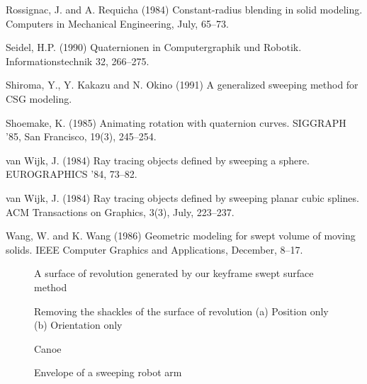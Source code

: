 \begin{thebibliography}{Shoemake 85}
Rossignac, J. and A. Requicha (1984)
Constant-radius blending in solid modeling.
Computers in Mechanical Engineering, July, 65--73.

Seidel, H.P. (1990) Quaternionen in Computergraphik und Robotik.
Informationstechnik 32, 266--275.

Shiroma, Y., Y. Kakazu and N. Okino (1991)
A generalized sweeping method for CSG modeling.

Shoemake, K. (1985) Animating rotation with quaternion curves.
SIGGRAPH '85, San Francisco, 19(3), 245--254.

van Wijk, J. (1984)
Ray tracing objects defined by sweeping a sphere.
EUROGRAPHICS '84, 73--82.

van Wijk, J. (1984)
Ray tracing objects defined by sweeping planar cubic splines.
ACM Transactions on Graphics, 3(3), July, 223--237.

Wang, W. and K. Wang (1986)
Geometric modeling for swept volume of moving solids.
IEEE Computer Graphics and Applications, December, 8--17.

\end{thebibliography}

\begin{figure}
\label{fig:coke}
\vspace{2in}
\caption{A surface of revolution generated by our keyframe swept surface method}
\end{figure}

\begin{figure}
\label{fig:cokewarp}
\vspace{2in}
\caption{Removing the shackles of the surface of revolution
	(a) Position only (b) Orientation only}
\end{figure}

\begin{figure}
\label{fig:canoe}
\vspace{2in}
\caption{Canoe}
\end{figure}

\begin{figure}
\label{fig:robot}
\vspace{2in}
\caption{Envelope of a sweeping robot arm}
\end{figure}


